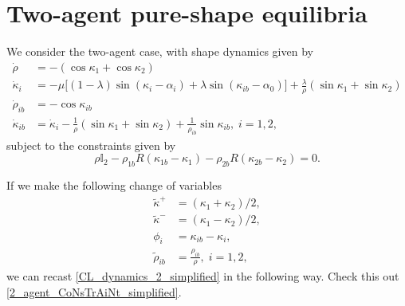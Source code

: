 \section{Two-agent pure-shape equilibria}

We consider the two-agent case, with shape dynamics given by
\begin{equation}
\begin{aligned}
\dot{\rho} &= - (\cos\kappa_1 + \cos\kappa_2) 
\\
\dot{\kappa}_i &= - \mu \Big[(1 - \lambda)\sin(\kappa_i - \alpha_i) + \lambda \sin(\kappa_{ib} - \alpha_0) \Big] + \frac{\lambda}{\rho}(\sin\kappa_1 + \sin\kappa_2) 
\\
\dot{\rho}_{ib} &= - \cos\kappa_{ib}  
\\
\dot{\kappa}_{ib} &= \dot{\kappa}_i - \frac{1}{\rho}(\sin\kappa_1 + \sin\kappa_2) + \frac{1}{\rho_{ib}} \sin\kappa_{ib},  \; i=1,2,
\end{aligned}
\label{CL_dynamics_2_simplified}
\end{equation}
subject to the constraints given by
\begin{equation}
\rho \mathbb{I}_2 - \rho_{1b} R(\kappa_{1b} - \kappa_1) - \rho_{2b} R(\kappa_{2b} - \kappa_{2}) = 0. 
\label{2_agent_CoNsTrAiNt_simplified}
\end{equation}

If we make the following change of variables
\begin{align}
\tilde{\kappa}^+ 
&= (\kappa_1 + \kappa_2)/2,
\\
\tilde{\kappa}^- 
&= 
(\kappa_1 - \kappa_2)/2,
\\
\phi_{i} 
&= 
\kappa_{ib} - \kappa_i,
\\
\tilde{\rho}_{ib} 
&= 
\frac{\rho_{ib} }{\rho}, 
\; i=1,2,
\end{align}
we can recast \eqref{CL_dynamics_2_simplified} in the following way. Check this out \eqref{2_agent_CoNsTrAiNt_simplified}.


\begin{equation}

\end{equation}
  
  
  
  